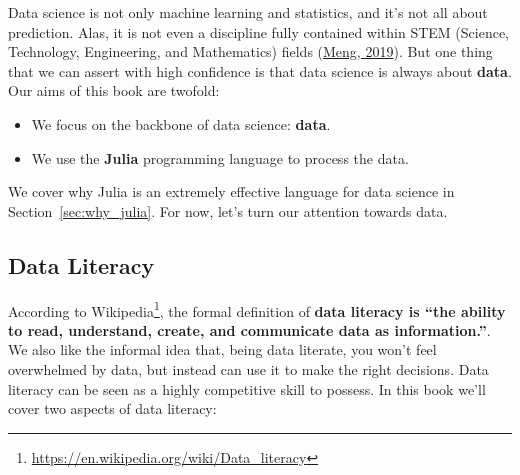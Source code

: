 \documentclass[
  notoc %
]{tufte-book}
\DeclareRobustCommand{\href}[2]{#2\footnote{\url{#1}}}
\providecommand{\tightlist}{%
  \setlength{\itemsep}{0pt}\setlength{\parskip}{0pt}
}
\begin{document}
Data science is not only machine learning and statistics, and it's not
all about prediction. Alas, it is not even a discipline fully contained
within STEM (Science, Technology, Engineering, and Mathematics) fields
(\protect\hyperlink{ref-Meng2019Data}{Meng, 2019}). But one thing that
we can assert with high confidence is that data science is always about
\textbf{data}. Our aims of this book are twofold:

\begin{itemize}
\tightlist
\item
  We focus on the backbone of data science: \textbf{data}.
\item
  We use the \textbf{Julia} programming language to process the data.
\end{itemize}

We cover why Julia is an extremely effective language for data science
in Section~\ref{sec:why_julia}. For now, let's turn our attention
towards data.

\hypertarget{sec:data_literacy}{%
\subsection{Data Literacy}\label{sec:data_literacy}}

According to
\href{https://en.wikipedia.org/wiki/Data_literacy}{Wikipedia}, the
formal definition of \textbf{data literacy is ``the ability to read,
understand, create, and communicate data as information.''}. We also
like the informal idea that, being data literate, you won't feel
overwhelmed by data, but instead can use it to make the right decisions.
Data literacy can be seen as a highly competitive skill to possess. In
this book we'll cover two aspects of data literacy:
\end{document}
